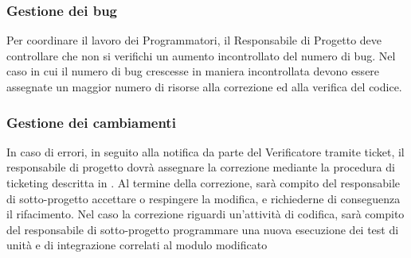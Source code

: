 \subsubsection{Gestione dei bug}
Per coordinare il lavoro dei Programmatori, il Responsabile di Progetto deve controllare che non
si verifichi un aumento incontrollato del numero di bug. Nel caso in cui il numero di bug crescesse in maniera incontrollata
devono essere assegnate un maggior numero di risorse alla correzione ed alla verifica del codice.

\subsubsection{Gestione dei cambiamenti}

In caso di errori, in seguito alla notifica da parte del Verificatore tramite ticket, il
responsabile di progetto dovrà assegnare la correzione mediante la procedura di
ticketing descritta in 
. Al termine della correzione, sarà compito del responsabile
di sotto-progetto accettare o respingere la modifica, e richiederne di conseguenza il rifacimento.
Nel caso la correzione riguardi un’attività di codifica, sarà compito del responsabile di sotto-progetto programmare una nuova esecuzione dei test di unità e di integrazione correlati al modulo modificato


